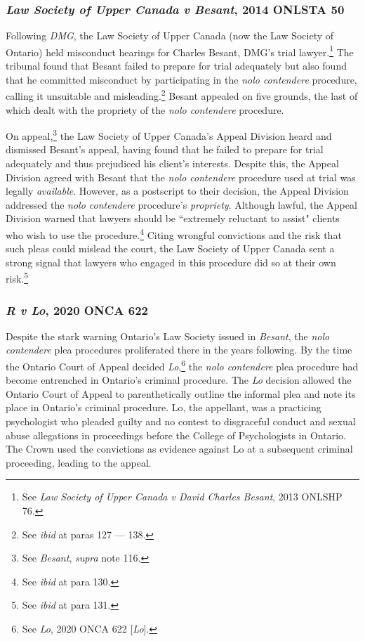 \subsubsection{\textit{Law Society of Upper Canada v Besant}, 2014 ONLSTA 50}

Following \textit{DMG}, the Law Society of Upper Canada (now the Law Society of Ontario) held misconduct hearings for Charles Besant, DMG's trial lawyer.\footnote{See \textit{Law Society of Upper Canada v David Charles Besant}, 2013 ONLSHP 76.} The tribunal found that Besant failed to prepare for trial adequately but also found that he committed misconduct by participating in the \textit{nolo contendere} procedure, calling it unsuitable and misleading.\footnote{See \textit{ibid} at paras 127 — 138.} Besant appealed on five grounds, the last of which dealt with the propriety of the \textit{nolo contendere} procedure.

On appeal,\footnote{See \textit{Besant}, \textit{supra} note 116.} the Law Society of Upper Canada's Appeal Division heard and dismissed Besant's appeal, having found that he failed to prepare for trial adequately and thus prejudiced his client's interests. Despite this, the Appeal Division agreed with Besant that the \textit{nolo contendere} procedure used at trial was legally \textit{available}. However, as a postscript to their decision, the Appeal Division addressed the \textit{nolo contendere} procedure's \textit{propriety}. Although lawful, the Appeal Division warned that lawyers should be ``extremely reluctant to assist" clients who wish to use the procedure.\footnote{See \textit{ibid} at para 130.} Citing wrongful convictions and the risk that such pleas could mislead the court, the Law Society of Upper Canada sent a strong signal that lawyers who engaged in this procedure did so at their own risk.\footnote{See \textit{ibid} at para 131.} 

\subsubsection{\textit{R v Lo}, 2020 ONCA 622}

Despite the stark warning Ontario's Law Society issued in \textit{Besant}, the \textit{nolo contendere} plea procedures proliferated there in the years following. By the time the Ontario Court of Appeal decided \textit{Lo},\footnote{See \textit{Lo}, 2020 ONCA 622 [\textit{Lo}].} the \textit{nolo contendere} plea procedure had become entrenched in Ontario's criminal procedure. The \textit{Lo} decision allowed the Ontario Court of Appeal to parenthetically outline the informal plea and note its place in Ontario's criminal procedure. Lo, the appellant, was a practicing psychologist who pleaded guilty and no contest to disgraceful conduct and sexual abuse allegations in proceedings before the College of Psychologists in Ontario. The Crown used the convictions as evidence against Lo at a subsequent criminal proceeding, leading to the appeal.

